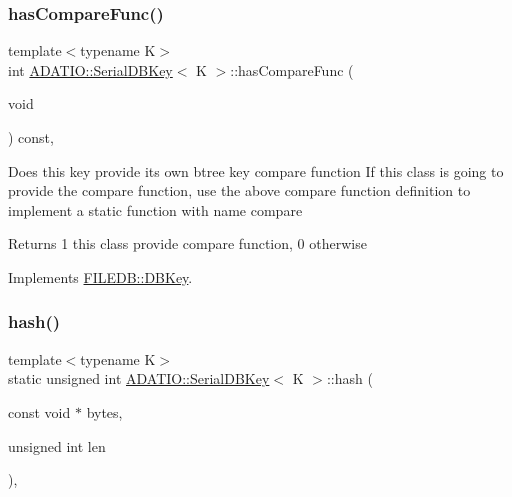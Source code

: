 \subsubsection{\texorpdfstring{hasCompareFunc()}{hasCompareFunc()}\hspace{0.1cm}{\footnotesize\ttfamily [3/3]}}
{\footnotesize\ttfamily template$<$typename K$>$ \\
int \mbox{\hyperlink{classADATIO_1_1SerialDBKey}{A\+D\+A\+T\+I\+O\+::\+Serial\+D\+B\+Key}}$<$ K $>$\+::has\+Compare\+Func (\begin{DoxyParamCaption}\item[{void}]{ }\end{DoxyParamCaption}) const\hspace{0.3cm}{\ttfamily [inline]}, {\ttfamily [virtual]}}

Does this key provide its own btree key compare function If this class is going to provide the compare function, use the above compare function definition to implement a static function with name compare

\begin{DoxyReturn}{Returns}
1 this class provide compare function, 0 otherwise 
\end{DoxyReturn}


Implements \mbox{\hyperlink{classFILEDB_1_1DBKey_a416c32ba10caf76e6b7ff4986cfc3c05}{F\+I\+L\+E\+D\+B\+::\+D\+B\+Key}}.

\mbox{\label{classADATIO_1_1SerialDBKey_a09904405d7dc203997431c6ca8af87ae}} 
\subsubsection{\texorpdfstring{hash()}{hash()}\hspace{0.1cm}{\footnotesize\ttfamily [1/3]}}
{\footnotesize\ttfamily template$<$typename K$>$ \\
static unsigned int \mbox{\hyperlink{classADATIO_1_1SerialDBKey}{A\+D\+A\+T\+I\+O\+::\+Serial\+D\+B\+Key}}$<$ K $>$\+::hash (\begin{DoxyParamCaption}\item[{const void $\ast$}]{bytes,  }\item[{unsigned int}]{len }\end{DoxyParamCaption})\hspace{0.3cm}{\ttfamily [inline]}, {\ttfamily [static]}}

